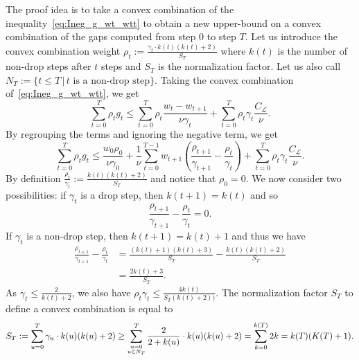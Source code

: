 \documentclass[twoside]{article}
\renewcommand{\L}{\mathcal{L}}
\newcommand{\wt}{w_t}
\newcommand{\gap}{g_{t}}
\newcommand{\CondNumb}{\nu}
\newcommand{\stepsize}{\gamma}
\newcommand{\0}{\mathbf{0}} %
\begin{document}
  The proof idea is to take a convex combination of the inequality~\eqref{eq:Ineg_g_wt_wtt} to obtain a new upper-bound on a convex combination of the gaps computed from step $0$ to step $T$. Let us introduce the convex combination weight $\rho_t := \frac{\stepsize_t\cdot  k(t)( k(t) +2) }{S_T}$ where $k(t)$ is the number of non-drop steps after $t$ steps and $S_T$ is the normalization factor. Let us  also call $N_T := \{ t \leq T \, | \, t \text{ is a non-drop step}\}$.  Taking the convex combination of~\eqref{eq:Ineg_g_wt_wtt}, we get
  \begin{equation} \label{eq:Ineg_mean_g_wt_wtt}
        \sum_{t=0}^T \rho_t \gap \leq 
        \sum_{t=0}^T \rho_t \frac{\wt  -w_{t+1}}{\CondNumb \stepsize_t }+ 
        \sum_{t=0}^T \rho_t \gamma_t \frac{C_\L}{\CondNumb}. 
  \end{equation}
  By regrouping the terms and ignoring the negative term, we get
  \begin{equation} \label{eq:sum_gt_wt_rhot}
        \sum_{t=0}^T \rho_t \gap \leq 
        \frac{w_0 \rho_0}{\CondNumb \stepsize_0} +
        \frac{1}{\CondNumb}\sum_{t=0}^{T-1} w_{t+1}\left( \frac{\rho_{t+1}}{ \stepsize_{t+1} }   -\frac{\rho_t}{ \stepsize_t}\right)+ 
        \sum_{t=0}^{T} \rho_t \gamma_t \frac{C_\L}{\CondNumb}. 
  \end{equation}
  By definition $\frac{\rho_t}{\stepsize_t} := \frac{k(t)(k(t)+2)}{S_T}$ and notice that $\rho_0 = 0$. We now consider two possibilities: if $\gamma_t$ is a drop step, then $k(t+1) = k(t)$ and so
  \begin{equation}
   \frac{\rho_{t+1}}{ \stepsize_{t+1}} - \frac{\rho_{t}}{ \stepsize_{t}} = 0.
  \end{equation}
  If $\stepsize_t$ is a non-drop step, then $k(t+1) = k(t) + 1$ and thus we have
%
  \begin{align}
     \frac{\rho_{t+1}}{ \stepsize_{t+1}} - \frac{\rho_{t}}{ \stepsize_{t}} 
     &=   \frac{(k(t)+1)(k(t)+3)}{S_T} -  \frac{k(t)(k(t)+2)}{S_T} \\
     &= \frac{2k(t)+3}{S_T}. \label{eq:rho/gamma} 
  \end{align}
  As $\stepsize_t \leq \frac{2}{k(t)+2}$, we also have $\rho_t \stepsize_t \leq \frac{4 k(t)}{S_T (k(t)+2))} $.
  The normalization factor $S_T$ to define a convex combination is equal to 
  \begin{equation}
    S_T := \sum_{u=0}^T \stepsize_u \cdot k(u)( k(u) +2)  
    \geq  \sum_{\small\substack{u=0 \\ u \in N_{T} }}^T  \frac{2}{2 +k(u)} \cdot k(u)( k(u) +2) 
    = \sum_{k = 0}^{k(T)} 2 k
    = k(T)(K(T)+1).  
  \end{equation}
\end{document}
